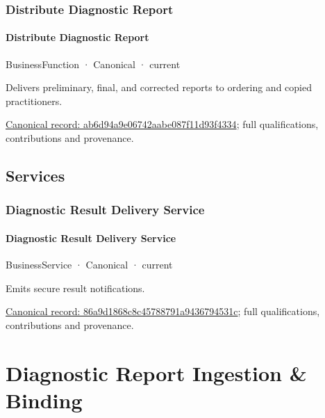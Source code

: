 \subsubsection{Distribute Diagnostic Report}

\paragraph{Distribute Diagnostic Report}

\label{element:ab6d94a9e06742aabe087f11d93f4334}
{\small BusinessFunction · Canonical · current}\par

Delivers preliminary, final, and corrected reports to ordering and copied practitioners.


{\footnotesize \href{../../../../continuum/business/business-function/ab6d94a9e06742aabe087f11d93f4334.md}{Canonical record: ab6d94a9e06742aabe087f11d93f4334}; full qualifications, contributions and provenance.}\par
\subsection{Services}

\subsubsection{Diagnostic Result Delivery Service}

\paragraph{Diagnostic Result Delivery Service}

\label{element:86a9d1868c8c45788791a9436794531c}
{\small BusinessService · Canonical · current}\par

Emits secure result notifications.


{\footnotesize \href{../../../../continuum/business/business-service/86a9d1868c8c45788791a9436794531c.md}{Canonical record: 86a9d1868c8c45788791a9436794531c}; full qualifications, contributions and provenance.}\par
\section{Diagnostic Report Ingestion \& Binding}

